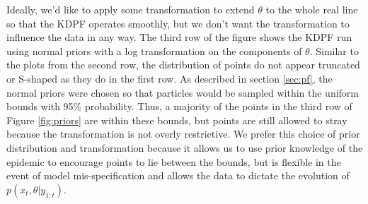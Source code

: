 \documentclass{elsarticle}
\begin{document}
Ideally, we'd like to apply some transformation to extend $\theta$ to the whole real line so that the KDPF operates smoothly, but we don't want the transformation to influence the data in any way.  The third row of the figure shows the KDPF run using normal priors with a log transformation on the components of $\theta$.  Similar to the plots from the second row, the distribution of points do not appear truncated or S-shaped as they do in the first row.  As described in section \ref{sec:pf}, the normal priors were chosen so that particles would be sampled within the uniform bounds with 95\% probability.  Thus, a majority of the points in the third row of Figure \ref{fig:priors} are within these bounds, but points are still allowed to stray because the transformation is not overly restrictive.  We prefer this choice of prior distribution and transformation because it allows us to use prior knowledge of the epidemic to encourage points to lie between the bounds, but is flexible in the event of model mis-specification and allows the data to dictate the evolution of $p(x_t,\theta|y_{1:t})$.
\end{document}
